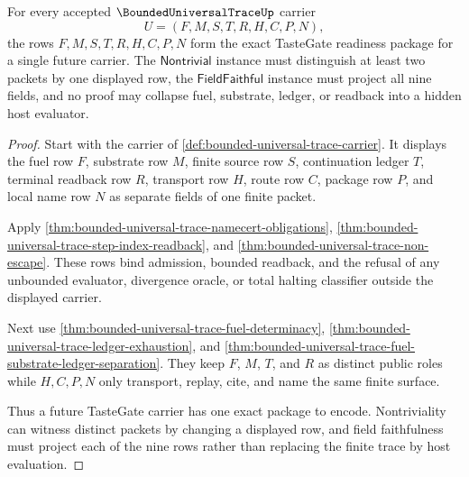 \begin{theorem}
\label{thm:bounded-universal-trace-tastegate-readiness-package}
For every accepted $\BoundedUniversalTraceUp$ carrier
$$
U=(F,M,S,T,R,H,C,P,N),
$$
the rows $F,M,S,T,R,H,C,P,N$ form the exact TasteGate readiness package for a single future carrier. The $\mathsf{Nontrivial}$ instance must distinguish at least two packets by one displayed row, the $\mathsf{FieldFaithful}$ instance must project all nine fields, and no proof may collapse fuel, substrate, ledger, or readback into a hidden host evaluator.
\end{theorem}
\begin{proof}
Start with the carrier of \autoref{def:bounded-universal-trace-carrier}. It displays the fuel row $F$, substrate row $M$, finite source row $S$, continuation ledger $T$, terminal readback row $R$, transport row $H$, route row $C$, package row $P$, and local name row $N$ as separate fields of one finite packet.

Apply \autoref{thm:bounded-universal-trace-namecert-obligations}, \autoref{thm:bounded-universal-trace-step-index-readback}, and \autoref{thm:bounded-universal-trace-non-escape}. These rows bind admission, bounded readback, and the refusal of any unbounded evaluator, divergence oracle, or total halting classifier outside the displayed carrier.

Next use \autoref{thm:bounded-universal-trace-fuel-determinacy}, \autoref{thm:bounded-universal-trace-ledger-exhaustion}, and \autoref{thm:bounded-universal-trace-fuel-substrate-ledger-separation}. They keep $F$, $M$, $T$, and $R$ as distinct public roles while $H,C,P,N$ only transport, replay, cite, and name the same finite surface.

Thus a future TasteGate carrier has one exact package to encode. Nontriviality can witness distinct packets by changing a displayed row, and field faithfulness must project each of the nine rows rather than replacing the finite trace by host evaluation.
\end{proof}

